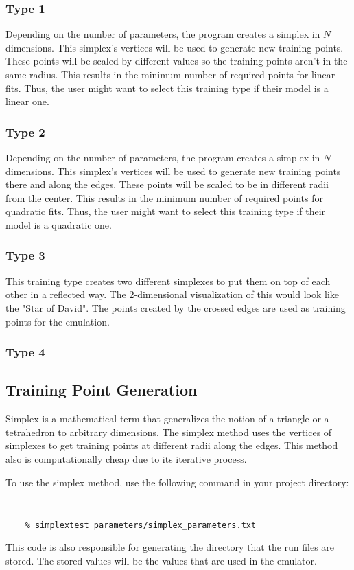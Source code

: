 \documentclass[main.tex]{subfiles}
\begin{document}
\subsubsection{Type 1}
 Depending on the number of parameters, the program creates a simplex in $N$ dimensions. This simplex's vertices will be used to generate new training points. These points will be scaled by different values so the training points aren't in the same radius. This results in the minimum number of required points for linear fits. Thus, the user might want to select this training type if their model is a linear one.

\subsubsection{Type 2}

 Depending on the number of parameters, the program creates a simplex in $N$ dimensions. This simplex's vertices will be used to generate new training points there and along the edges. These points will be scaled to be in different radii from the center. This results in the minimum number of required points for quadratic fits. Thus, the user might want to select this training type if their model is a quadratic one.
 
\subsubsection{Type 3}
This training type creates two different simplexes to put them on top of each other in a reflected way. The 2-dimensional visualization of this would look like the "Star of David". The points created by the crossed edges are used as training points for the emulation.
 
\subsubsection{Type 4}

\subsection{Training Point Generation}

Simplex is a mathematical term that generalizes the notion of a triangle or a tetrahedron to arbitrary dimensions. The simplex method uses the vertices of simplexes to get training points at different radii along the edges. This method also is computationally cheap due to its iterative process.

To use the simplex method, use the following command in your project directory:

{\tt
{
\begin{verbatim}
    % simplextest parameters/simplex_parameters.txt
\end{verbatim}
}}

This code is also responsible for generating the directory that the run files are stored. The stored values will be the values that are used in the emulator.
\end{document}
